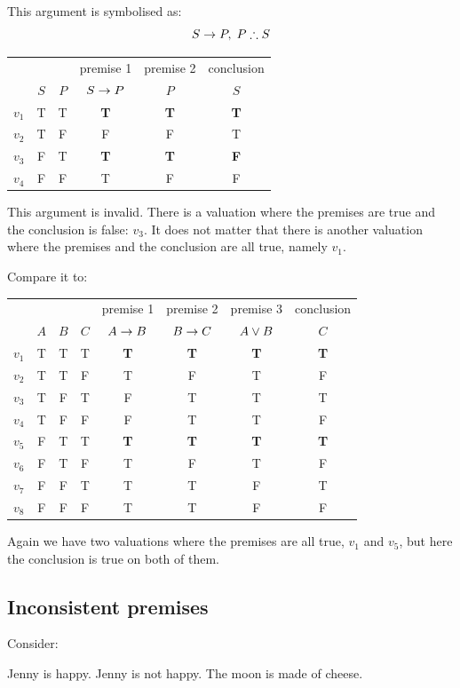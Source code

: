 This argument is symbolised as:
\[
	S \eif P,\; P \therefore S
\]

\begin{center}
	\begin{tabular}{rcc|c|c|c}
		&&&premise 1&premise 2&conclusion\\
		&$S$&$P$&$S \rightarrow P$&$P$&$S$\\\hline
		$v_1$&T&T&\textbf{T}&\textbf{T}&\textbf{T}\\
		$v_2$&T&F&F&F&T\\
		$v_3$&F&T&\textbf{T}&\textbf{T}&\textbf{F}\\
		$v_4$&F&F&T&F&F\\
	\end{tabular}
\end{center}

This argument is invalid. There is a valuation where the premises are true and the conclusion is false: $v_3$.
It does not matter that there is another valuation where the premises and the conclusion are all true, namely $v_1$.

Compare it to:
\begin{center}
	\begin{tabular}{rccc|c|c|c|c}
		&&&&premise 1&premise 2&premise 3&conclusion\\
		&$A$&$B$&$C$&$A \rightarrow B$&$B \rightarrow C$&$A\vee B$&$C$\\\hline
		$v_1$&T&T&T&\textbf{T}&\textbf{T}&\textbf{T}&\textbf{T}\\
		$v_2$&T&T&F&T&F&T&F\\
		$v_3$&T&F&T&F&T&T&T\\
		$v_4$&T&F&F&F&T&T&F\\
		$v_5$&F&T&T&\textbf{T}&\textbf{T}&\textbf{T}&\textbf{T}\\
		$v_6$&F&T&F&T&F&T&F\\
		$v_7$&F&F&T&T&T&F&T\\
		$v_8$&F&F&F&T&T&F&F\\
	\end{tabular}
\end{center}
Again we have two valuations where the premises are all true, $v_1$ and $v_5$, but here the conclusion is true on both of them. 
\subsection{Inconsistent premises}
Consider:
\begin{earg}
	\prem Jenny is happy.
	\prem Jenny is not happy.
	\conc The moon is made of cheese.
\end{earg}

